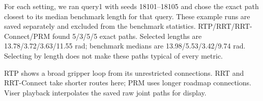 For each setting, we ran query1 with seeds 18101--18105 and chose the exact path closest to its median benchmark length for that query. These example runs are saved separately and excluded from the benchmark statistics. RTP/RRT/RRT-Connect/PRM found 5/3/5/5 exact paths. Selected lengths are 13.78/3.72/3.63/11.55 rad; benchmark medians are 13.98/5.53/3.42/9.74 rad. Selecting by length does not make these paths typical of every metric.

RTP shows a broad gripper loop from its unrestricted connections. RRT and RRT-Connect take shorter routes here; PRM uses longer roadmap connections. Viser playback interpolates the saved raw joint paths for display.
